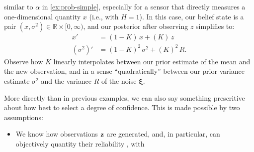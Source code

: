 \begin{subappendices}
\begin{example}
    similar to $\alpha$ in \cref{ex:prob-simple},
    especially
    \def\onedvar{\sigma^2}%
    for a sensor that directly measures a one-dimensional quantity
    $x$ (i.e., with $H = 1$). In this case, our belief state is a pair
    $(x, \onedvar) \in \mathbb R \times [0, \infty)$,
    and our posterior after observing $z$ simplifies to:
    \begin{align*}
    x'
    	&= (1-K)\, x + (K)\, z
    	\\
    ({\onedvar})' &= (1 - K)^2 \,\onedvar + (K)^2\, R.
    \end{align*}
    Observe how $K$ linearly interpolates between our prior estimate of the mean
    and the new observation,
    and in a sense ``quadratically'' between our prior variance estimate $\onedvar$ and
    the variance $R$ of the noise $\boldsymbol\xi$.

    More directly than in previous examples,
    we can also say something prescritive about how best to select
    a degree of confidence.
    This is made possible by two assumptions:
    \begin{itemize}
    \item
    We know how observations $\mathbf z$ are generated,
    and, in particular, can objectively quantity
    their reliability
    \unskip,
    with


\end{itemize}
\end{example}
\end{subappendices}
